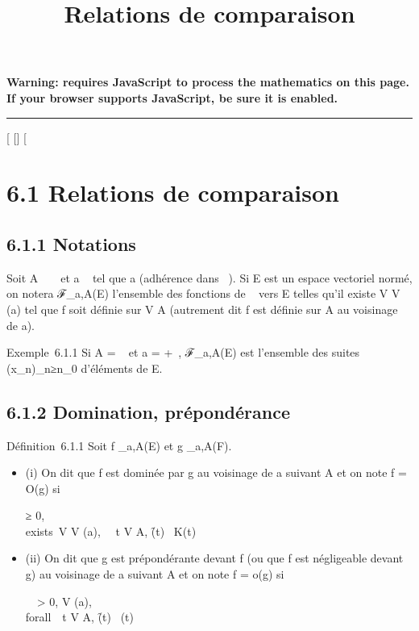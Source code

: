 \documentclass[]{article}
\title{Relations de comparaison}
\author{}
\date{}
\begin{document}
\maketitle

\textbf{Warning: 
requires JavaScript to process the mathematics on this page.\\ If your
browser supports JavaScript, be sure it is enabled.}

\begin{center}\rule{3in}{0.4pt}\end{center}

[
[]
[

\section{6.1 Relations de comparaison}

\subsection{6.1.1 Notations}

Soit A \subset~ ~ et a \in\overline{}~ tel que a
\in\overlineA (adhérence dans
\overline{}~). Si E est un espace vectoriel normé, on
notera ℱ_a,A(E) l'ensemble des fonctions de ~ vers E telles
qu'il existe V \in V (a) tel que f soit définie sur V \bigcap A (autrement dit f
est définie sur A au voisinage de a).

Exemple~6.1.1 Si A = ~ et a = +\infty~, ℱ_a,A(E) est l'ensemble des
suites (x_n)_n≥n_0 d'éléments de E.

\subsection{6.1.2 Domination, prépondérance}

Définition~6.1.1 Soit f _a,A(E) et g _a,A(F).

\begin{itemize}
\item
  (i) On dit que f est dominée par g au voisinage de a suivant A et on
  note f = O(g) si

  \existsK ≥ 0, \\exists~V \in V
  (a), \forall~~t \in V \bigcap A,
  \f(t)\ \leq
  K\g(t)\
\item
  (ii) On dit que g est prépondérante devant f (ou que f est négligeable
  devant g) au voisinage de a suivant A et on note f = o(g) si

  \forall~~\epsilon > 0,
  \existsV \in V (a), \\forall~~t \in V
  \bigcap A, \f(t)\ \leq
  \epsilon\g(t)\
\end{itemize}
\end{document}
